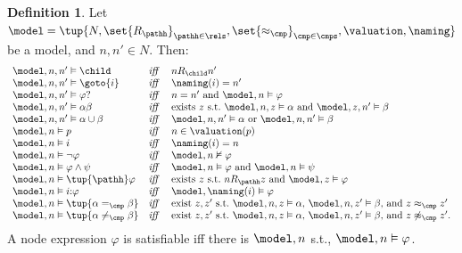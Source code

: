 \documentclass[10pt,a4paper]{amsart}
\theoremstyle{definition}
\newtheorem{defi}[thm]{Definition}
\theoremstyle{remark}
\begin{document}
\begin{defi}\label{def:semantics}
  Let $\model = \tup{N, \set{R_\pathh}_{\pathh \in \rels}, \set{\approx_{\cmp}}_{\cmp\in\cmps}, \valuation, \naming}$ be a model, and $n,n'\in N$. Then: 
  \[
    \begin{array}{l@{\quad}l@{\quad}l}
      \model, n, n' \vDash \child
        & \text{\it iff} &   n R_{\child} n'   \\
      \model, n, n' \vDash \goto{i}
        & \text{\it iff } &  \naming(i) = n' \\ 
      \model, n, n' \vDash  \varphi?
        & \text{\it iff} & n=n' \text{ and } \model, n \vDash   \varphi  \\
      \model, n, n' \vDash \alpha\beta
        & \text{\it iff} & \text{exists } z \text{ s.t.\ } \model,  n, z \vDash \alpha \text{ and }  \model,  z, n' \vDash \beta \\
      \model, n, n' \vDash \alpha \cup \beta
        & \text{\it iff} & \model, n, n' \vDash  \alpha  \text{ or } \model, n, n' \vDash  \beta \\
      \model, n    \vDash p
        & \text{\it iff} &  n \in \valuation(p)\\
      \model, n    \vDash i
        & \text{\it iff} &  \naming(i) = n \\
      \model, n    \vDash \lnot \varphi
        & \text{\it iff} &   \model, n \nvDash  \varphi \\
      \model, n    \vDash \varphi \land \psi
        & \text{\it iff} &   \model, n \vDash  \varphi \text{ and }  \model, n \vDash  \psi  \\
      \model, n    \vDash  \tup{\pathh}\varphi
        & \text{\it iff} & \text{exists } z \text{ s.t.\ } nR_{\pathh}z \text{ and } \model, z \vDash \varphi \\
      \model, n   \vDash  i{:}\varphi
        & \text{\it iff } & \model, \naming(i) \vDash \varphi \\
      \model, n    \vDash \tup{\alpha =_\cmp \beta}
        & \text{\it iff} & \text{exist } z, z' \text{ s.t.\ } \model, n, z \vDash  \alpha \text{, } \model, n, z' \vDash  \beta \text{, and } z \approx_\cmp z' \\
      \model, n    \vDash \tup{\alpha \neq_\cmp \beta}
        & \text{\it iff} & \text{exist } z, z' \text{ s.t.\ } \model, n, z \vDash  \alpha \text{, } \model, n, z' \vDash  \beta \text{, and } z \not\approx_\cmp z'.
    \end{array}
  \]
  A node expression $\varphi$ is satisfiable iff there is $\model, n$ s.t., $\model, n \vDash \varphi$.

\end{defi}
\end{document}
